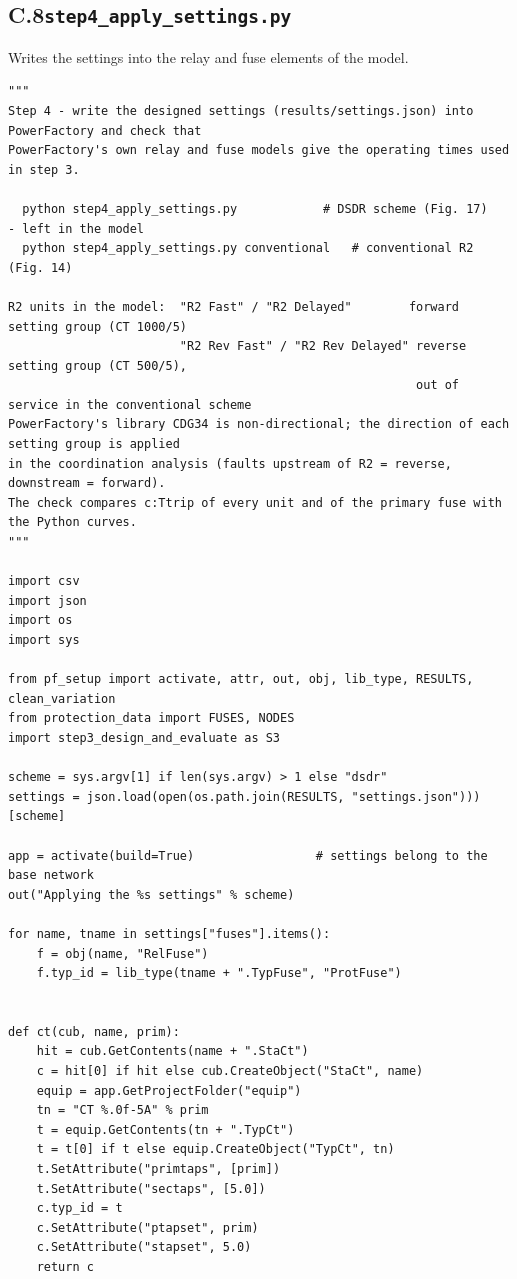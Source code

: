 \documentclass[12pt,a4paper]{article}
\begin{document}
\subsection*{C.8\quad \texttt{step4\_apply\_settings.py}}
Writes the settings into the relay and fuse elements of the model.
\begin{lstlisting}
"""
Step 4 - write the designed settings (results/settings.json) into PowerFactory and check that
PowerFactory's own relay and fuse models give the operating times used in step 3.

  python step4_apply_settings.py            # DSDR scheme (Fig. 17)   - left in the model
  python step4_apply_settings.py conventional   # conventional R2 (Fig. 14)

R2 units in the model:  "R2 Fast" / "R2 Delayed"        forward setting group (CT 1000/5)
                        "R2 Rev Fast" / "R2 Rev Delayed" reverse setting group (CT 500/5),
                                                         out of service in the conventional scheme
PowerFactory's library CDG34 is non-directional; the direction of each setting group is applied
in the coordination analysis (faults upstream of R2 = reverse, downstream = forward).
The check compares c:Ttrip of every unit and of the primary fuse with the Python curves.
"""

import csv
import json
import os
import sys

from pf_setup import activate, attr, out, obj, lib_type, RESULTS, clean_variation
from protection_data import FUSES, NODES
import step3_design_and_evaluate as S3

scheme = sys.argv[1] if len(sys.argv) > 1 else "dsdr"
settings = json.load(open(os.path.join(RESULTS, "settings.json")))[scheme]

app = activate(build=True)                 # settings belong to the base network
out("Applying the %s settings" % scheme)

for name, tname in settings["fuses"].items():
    f = obj(name, "RelFuse")
    f.typ_id = lib_type(tname + ".TypFuse", "ProtFuse")


def ct(cub, name, prim):
    hit = cub.GetContents(name + ".StaCt")
    c = hit[0] if hit else cub.CreateObject("StaCt", name)
    equip = app.GetProjectFolder("equip")
    tn = "CT %.0f-5A" % prim
    t = equip.GetContents(tn + ".TypCt")
    t = t[0] if t else equip.CreateObject("TypCt", tn)
    t.SetAttribute("primtaps", [prim])
    t.SetAttribute("sectaps", [5.0])
    c.typ_id = t
    c.SetAttribute("ptapset", prim)
    c.SetAttribute("stapset", 5.0)
    return c



\end{lstlisting}
\end{document}
